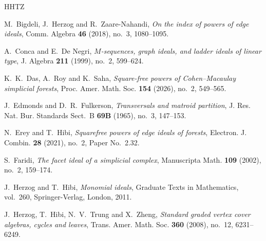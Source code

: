 \documentclass{amsart}
\theoremstyle{definition}
\theoremstyle{remark}
\begin{document}
\begin{thebibliography}{HHTZ}

M.~Bigdeli, J.~Herzog and R.~Zaare-Nahandi, \emph{On the index of powers of edge ideals}, Comm. Algebra \textbf{46} (2018), no.~3, 1080--1095.

A.~Conca and E.~De Negri, \emph{$M$-sequences, graph ideals, and ladder ideals of linear type}, J. Algebra \textbf{211} (1999), no.~2, 599--624.

 K.~K.~Das, A.~Roy and K.~Saha, \emph{Square-free powers of Cohen--Macaulay simplicial forests}, Proc. Amer. Math. Soc. \textbf{154} (2026), no.~2, 549--565.

J.~Edmonds and D.~R.~Fulkerson,
\textit{Transversals and matroid partition},
J. Res. Nat. Bur. Standards Sect.~B \textbf{69B} (1965), no.~3, 147--153.

N.~Erey and T.~Hibi, \emph{Squarefree powers of edge ideals of forests}, Electron. J. Combin. \textbf{28} (2021), no.~2, Paper No.~2.32.



S.~Faridi, \emph{The facet ideal of a simplicial complex}, Manuscripta Math. \textbf{109} (2002), no.~2, 159--174.


J.~Herzog and T.~Hibi, \emph{Monomial ideals}, Graduate Texts in Mathematics, vol.~260, Springer-Verlag, London, 2011.

J.~Herzog, T.~Hibi, N.~V.~Trung and X.~Zheng, \emph{Standard graded vertex cover algebras, cycles and leaves}, Trans. Amer. Math. Soc. \textbf{360} (2008), no.~12, 6231--6249.



\end{thebibliography}
\end{document}
